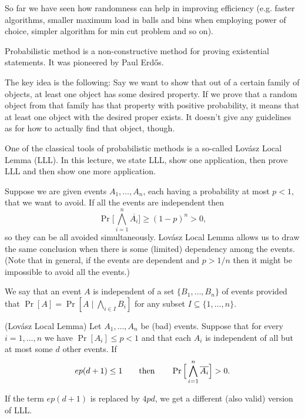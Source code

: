 
So far we have seen how randomness can help in improving efficiency (e.g. faster algorithms, smaller maximum load in balls and bins when employing power of choice, simpler algorithm for min cut problem and so on).

Probabilistic method is a non-constructive method for proving existential statements. It was pioneered by Paul Erd\H os.

The key idea is the following: Say we want to show that out of a certain family of objects, at least one object has some desired property. If we prove that a random object from that family has that property with positive probability, it means that at least one object with the desired proper exists. It doesn't give any guidelines as for how to actually find that object, though.

One of the classical tools of probabilistic methods is a so-called Lovász Local Lemma (LLL). In this lecture, we state LLL, show one application, then prove LLL and then show one more application.

Suppose we are given events $A_1,\dots,A_n$, each having a probability at most $p<1$, that we want to avoid. If all the events are independent then $$\Pr\Big[\bigwedge_{i=1}^n \overline{A_i}\Big]\geq (1-p)^n>0,$$ so they can be all avoided simultaneously. Lovász Local Lemma allows us to draw the same conclusion when there is some (limited) dependency among the events. (Note that in general, if the events are dependent and $p>1/n$ then it might be impossible to avoid all the events.)

\begin{definition} We say that an event $A$ is independent of a set $\{B_1,\dots,B_n\}$ of events provided that $\Pr[A]=\Pr[A\mid \bigwedge_{i\in I} B_i]$ for any subset $I\subseteq\{1,\dots,n\}$.\end{definition}

\begin{lemma} (Lovász Local Lemma) Let $A_1,\dots,A_n$ be (bad) events. Suppose that for every $i=1,\dots,n$ we have $\Pr[A_i]\leq p<1$ and that each $A_i$ is independent of all but at most some $d$ other events. If
$$ep(d+1)\leq 1\qquad{\rm then}\qquad \Pr\Big[\bigwedge_{i=1}^n \overline{A_i}\Big]>0.$$
\end{lemma}

\begin{remark}  If the term $ep(d+1)$ is replaced by $4pd$, we get a different (also valid) version of LLL.
\end{remark}

